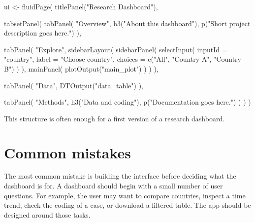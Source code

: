 \documentclass[
  letterpaper,
  DIV=11,
  numbers=noendperiod]{scrreprt}
\newenvironment{Shaded}{\begin{snugshade}}{\end{snugshade}}
\newcommand{\AttributeTok}[1]{\textcolor[rgb]{0.40,0.45,0.13}{#1}}
\newcommand{\FunctionTok}[1]{\textcolor[rgb]{0.28,0.35,0.67}{#1}}
\newcommand{\NormalTok}[1]{\textcolor[rgb]{0.00,0.23,0.31}{#1}}
\newcommand{\OtherTok}[1]{\textcolor[rgb]{0.00,0.23,0.31}{#1}}
\newcommand{\StringTok}[1]{\textcolor[rgb]{0.13,0.47,0.30}{#1}}
\begin{document}
\begin{Shaded}
\begin{Highlighting}[]
\NormalTok{ui }\OtherTok{\textless{}{-}} \FunctionTok{fluidPage}\NormalTok{(}
  \FunctionTok{titlePanel}\NormalTok{(}\StringTok{"Research Dashboard"}\NormalTok{),}
  
  \FunctionTok{tabsetPanel}\NormalTok{(}
    \FunctionTok{tabPanel}\NormalTok{(}
      \StringTok{"Overview"}\NormalTok{,}
      \FunctionTok{h3}\NormalTok{(}\StringTok{"About this dashboard"}\NormalTok{),}
      \FunctionTok{p}\NormalTok{(}\StringTok{"Short project description goes here."}\NormalTok{)}
\NormalTok{    ),}
    
    \FunctionTok{tabPanel}\NormalTok{(}
      \StringTok{"Explore"}\NormalTok{,}
      \FunctionTok{sidebarLayout}\NormalTok{(}
        \FunctionTok{sidebarPanel}\NormalTok{(}
          \FunctionTok{selectInput}\NormalTok{(}
            \AttributeTok{inputId =} \StringTok{"country"}\NormalTok{,}
            \AttributeTok{label =} \StringTok{"Choose country"}\NormalTok{,}
            \AttributeTok{choices =} \FunctionTok{c}\NormalTok{(}\StringTok{"All"}\NormalTok{, }\StringTok{"Country A"}\NormalTok{, }\StringTok{"Country B"}\NormalTok{)}
\NormalTok{          )}
\NormalTok{        ),}
        \FunctionTok{mainPanel}\NormalTok{(}
          \FunctionTok{plotOutput}\NormalTok{(}\StringTok{"main\_plot"}\NormalTok{)}
\NormalTok{        )}
\NormalTok{      )}
\NormalTok{    ),}
    
    \FunctionTok{tabPanel}\NormalTok{(}
      \StringTok{"Data"}\NormalTok{,}
      \FunctionTok{DTOutput}\NormalTok{(}\StringTok{"data\_table"}\NormalTok{)}
\NormalTok{    ),}
    
    \FunctionTok{tabPanel}\NormalTok{(}
      \StringTok{"Methods"}\NormalTok{,}
      \FunctionTok{h3}\NormalTok{(}\StringTok{"Data and coding"}\NormalTok{),}
      \FunctionTok{p}\NormalTok{(}\StringTok{"Documentation goes here."}\NormalTok{)}
\NormalTok{    )}
\NormalTok{  )}
\NormalTok{)}
\end{Highlighting}
\end{Shaded}

This structure is often enough for a first version of a research
dashboard.

\section{Common mistakes}\label{common-mistakes}

The most common mistake is building the interface before deciding what
the dashboard is for. A dashboard should begin with a small number of
user questions. For example, the user may want to compare countries,
inspect a time trend, check the coding of a case, or download a filtered
table. The app should be designed around those tasks.
\end{document}
